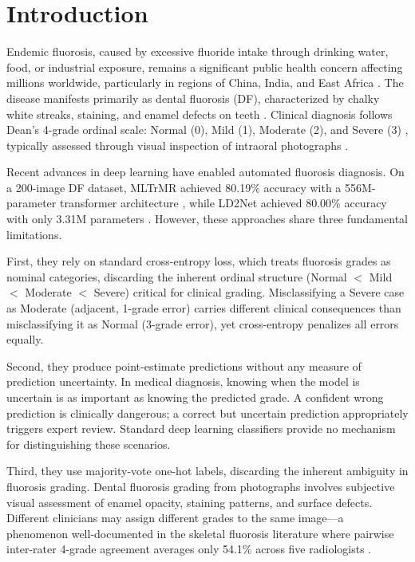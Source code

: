 \section{Introduction}

Endemic fluorosis, caused by excessive fluoride intake through drinking water, food, or industrial exposure, remains a significant public health concern affecting millions worldwide, particularly in regions of China, India, and East Africa \cite{gu2024zunyi,wei2019pathogenesis}. The disease manifests primarily as dental fluorosis (DF), characterized by chalky white streaks, staining, and enamel defects on teeth \cite{fejerskov1988dental,denbesten2011biological}. Clinical diagnosis follows Dean's 4-grade ordinal scale: Normal (0), Mild (1), Moderate (2), and Severe (3) \cite{dean1942fluorosis}, typically assessed through visual inspection of intraoral photographs \cite{schwendicke2021deep}.

Recent advances in deep learning have enabled automated fluorosis diagnosis. On a 200-image DF dataset, MLTrMR achieved 80.19\% accuracy with a 556M-parameter transformer architecture \cite{xu2025mltrmr}, while LD2Net achieved 80.00\% accuracy with only 3.31M parameters \cite{li2026ld2net}. However, these approaches share three fundamental limitations.

First, they rely on standard cross-entropy loss, which treats fluorosis grades as nominal categories, discarding the inherent ordinal structure (Normal $<$ Mild $<$ Moderate $<$ Severe) critical for clinical grading. Misclassifying a Severe case as Moderate (adjacent, 1-grade error) carries different clinical consequences than misclassifying it as Normal (3-grade error), yet cross-entropy penalizes all errors equally.

Second, they produce point-estimate predictions without any measure of prediction uncertainty. In medical diagnosis, knowing when the model is uncertain is as important as knowing the predicted grade. A confident wrong prediction is clinically dangerous; a correct but uncertain prediction appropriately triggers expert review. Standard deep learning classifiers provide no mechanism for distinguishing these scenarios.

Third, they use majority-vote one-hot labels, discarding the inherent ambiguity in fluorosis grading. Dental fluorosis grading from photographs involves subjective visual assessment of enamel opacity, staining patterns, and surface defects. Different clinicians may assign different grades to the same image---a phenomenon well-documented in the skeletal fluorosis literature where pairwise inter-rater 4-grade agreement averages only 54.1\% across five radiologists \cite{xu2025mwinc}.

